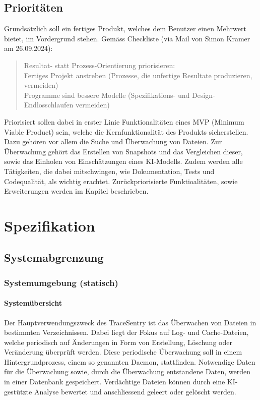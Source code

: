 \documentclass[a4paper,12pt]{report}
\begin{document}
    \section{Prioritäten}
    Grundsätzlich soll ein fertiges Produkt, welches dem Benutzer einen Mehrwert bietet, im Vordergrund stehen.
    Gemäss Checkliste (via Mail von Simon Kramer am 26.09.2024):
    \begin{quote}
        Resultat- statt Prozess-Orientierung priorisieren:
        \\Fertiges Projekt anstreben (Prozesse, die unfertige Resultate produzieren, vermeiden)
        \\Programme sind bessere Modelle (Spezifikations- und Design-Endlosschlaufen vermeiden)
    \end{quote}

    Priorisiert sollen dabei in erster Linie Funktionalitäten eines MVP (Minimum Viable Product) sein, welche die Kernfunktionalität des Produkts sicherstellen.
    Dazu gehören vor allem die Suche und Überwachung von Dateien.
    Zur Überwachung gehört das Erstellen von Snapshots und das Vergleichen dieser, sowie das Einholen von Einschätzungen eines KI-Modells.
    Zudem werden alle Tätigkeiten, die dabei mitschwingen, wie Dokumentation, Tests und Codequalität, als wichtig erachtet.
    Zurückpriorisierte Funktioalitäten, sowie Erweiterungen werden im Kapitel  beschrieben.


    \chapter{Spezifikation}\label{ch:spezifikation}


    \section{Systemabgrenzung}\label{sec:systemabgrenzung}

    \subsection{Systemumgebung (statisch)}\label{subsec:systemumgebung-(statisch)}

    \subsubsection{Systemübersicht}
    Der Hauptverwendungszweck des TraceSentry ist das Überwachen von Dateien in bestimmten Verzeichnissen.
    Dabei liegt der Fokus auf Log- und Cache-Dateien, welche periodisch auf Änderungen in Form von Erstellung, Löschung oder Veränderung überprüft werden.
    Diese periodische Überwachung soll in einem Hintergrundprozess, einem so genannten Daemon, stattfinden.
    Notwendige Daten für die Überwachung sowie, durch die Überwachung entstandene Daten, werden in einer Datenbank gespeichert.
    Verdächtige Dateien können durch eine KI-gestützte Analyse bewertet und anschliessend geleert oder gelöscht werden.
\end{document}
